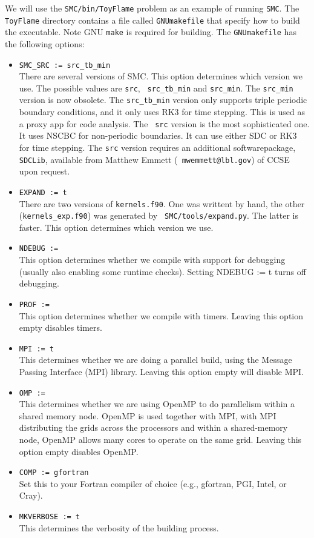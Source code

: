 \documentclass[11pt,letterpaper]{article}
\begin{document}
We will use the {\tt SMC/bin/ToyFlame} problem as an example of
running {\tt SMC}.  The {\tt ToyFlame} directory contains a file
called {\tt GNUmakefile} that specify how to build the executable.
Note GNU {\tt make} is required for building.  The {\tt GNUmakefile}
has the following options:
\begin{itemize}
\item {\tt SMC\_SRC := src\_tb\_min}\\
  There are several versions of SMC.  This option determines which
  version we use.  The possible values are {\tt src}, {\tt
    src\_tb\_min} and {\tt src\_min}.  The {\tt src\_min} version is
  now obsolete.  The {\tt src\_tb\_min} version only supports triple
  periodic boundary conditions, and it only uses RK3 for time
  stepping.  This is used as a proxy app for code analysis. The {\tt
    src} version is the most sophisticated one.  It uses NSCBC for
  non-periodic boundaries.  It can use either SDC or RK3 for time
  stepping.  The {\tt src} version requires an additional
  softwarepackage, {\tt SDCLib}, available from Matthew Emmett ({\tt
    mwemmett@lbl.gov}) of CCSE upon request.
\item {\tt EXPAND := t}\\
  There are two versions of {\tt kernels.f90}.  One was writtent by
  hand, the other ({\tt kernels\_exp.f90}) was generated by {\tt
    SMC/tools/expand.py}.  The latter is faster.  This option
  determines which version we use.
\item {\tt NDEBUG :=}\\
  This option determines whether we compile with support for debugging
  (usually also enabling some runtime checks). Setting NDEBUG := t
  turns off debugging.
\item {\tt PROF :=}\\
  This option determines whether we compile with timers. Leaving this
  option empty disables timers.
\item {\tt MPI := t}\\
  This determines whether we are doing a parallel build, using the
  Message Passing Interface (MPI) library. Leaving this
  option empty will disable MPI.
\item {\tt OMP :=}\\
  This determines whether we are using OpenMP to do parallelism within
  a shared memory node. OpenMP is used together with MPI, with MPI
  distributing the grids across the processors and within a
  shared-memory node, OpenMP allows many cores to operate on the same
  grid.  Leaving this option empty disables OpenMP.
\item {\tt COMP := gfortran}\\
  Set this to your Fortran compiler of choice (e.g., gfortran, PGI,
  Intel, or Cray).
\item {\tt MKVERBOSE := t}\\
  This determines the verbosity of the building process.
\end{itemize}
\end{document}
